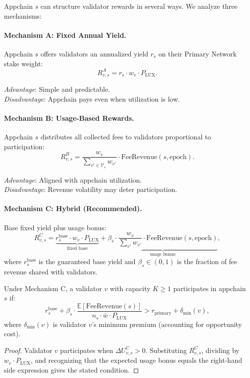 Appchain $s$ can structure validator rewards in several ways. We analyze three mechanisms:

\paragraph{Mechanism A: Fixed Annual Yield.}
Appchain $s$ offers validators an annualized yield $r_s$ on their Primary Network stake weight:
\[
  R_{v,s}^A = r_s \cdot w_v \cdot P_{\text{LUX}}.
\]

\textit{Advantage}: Simple and predictable. \\
\textit{Disadvantage}: Appchain pays even when utilization is low.

\paragraph{Mechanism B: Usage-Based Rewards.}
Appchain $s$ distributes all collected fees to validators proportional to participation:
\[
  R_{v,s}^B = \frac{w_v}{\sum_{v' \in \mathcal{V}_s} w_{v'}} \cdot \text{FeeRevenue}(s, \text{epoch}).
\]

\textit{Advantage}: Aligned with appchain utilization. \\
\textit{Disadvantage}: Revenue volatility may deter participation.

\paragraph{Mechanism C: Hybrid (Recommended).}
Base fixed yield plus usage bonus:
\[
  R_{v,s}^C = \underbrace{r_s^{\text{base}} \cdot w_v \cdot P_{\text{LUX}}}_{\text{fixed base}} + \underbrace{\beta_s \cdot \frac{w_v}{\sum_{v'} w_{v'}} \cdot \text{FeeRevenue}(s, \text{epoch})}_{\text{usage bonus}},
\]
where $r_s^{\text{base}}$ is the guaranteed base yield and $\beta_s \in (0,1)$ is the
fraction of fee revenue shared with validators.

\begin{theorem}
Under Mechanism C, a validator $v$ with capacity $K \geq 1$ participates in appchain $s$ if:
\[
  r_s^{\text{base}} + \beta_s \cdot \frac{\mathbb{E}[\text{FeeRevenue}(s)]}{n_s \cdot \bar{w} \cdot P_{\text{LUX}}} > r_{\text{primary}} + \delta_{\min}(v),
\]
where $\delta_{\min}(v)$ is validator $v$'s minimum premium (accounting for opportunity cost).
\end{theorem}

\begin{proof}
Validator $v$ participates when $\Delta U_{v,s}^C > 0$. Substituting $R_{v,s}^C$, dividing
by $w_v \cdot P_{\text{LUX}}$, and recognizing that the expected usage bonus equals the
right-hand side expression gives the stated condition.
\end{proof}

